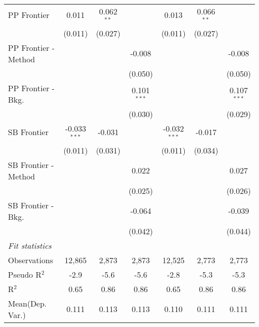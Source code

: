 \begin{tabular}{lcccccc}
   PP Frontier          & 0.011          & 0.062$^{**}$ &               & 0.013          & 0.066$^{**}$ &   \\   
                        & (0.011)        & (0.027)      &               & (0.011)        & (0.027)      &   \\   
   PP Frontier - Method &                &              & -0.008        &                &              & -0.008\\   
                        &                &              & (0.050)       &                &              & (0.050)\\   
   PP Frontier - Bkg.   &                &              & 0.101$^{***}$ &                &              & 0.107$^{***}$\\   
                        &                &              & (0.030)       &                &              & (0.029)\\   
   SB Frontier          & -0.033$^{***}$ & -0.031       &               & -0.032$^{***}$ & -0.017       &   \\   
                        & (0.011)        & (0.031)      &               & (0.011)        & (0.034)      &   \\   
   SB Frontier - Method &                &              & 0.022         &                &              & 0.027\\   
                        &                &              & (0.025)       &                &              & (0.026)\\   
   SB Frontier - Bkg.   &                &              & -0.064        &                &              & -0.039\\   
                        &                &              & (0.042)       &                &              & (0.044)\\   
   \midrule
   \emph{Fit statistics}\\
   Observations         & 12,865         & 2,873        & 2,873         & 12,525         & 2,773        & 2,773\\  
   Pseudo R$^2$         & -2.9           & -5.6         & -5.6          & -2.8           & -5.3         & -5.3\\  
   R$^2$                & 0.65           & 0.86         & 0.86          & 0.65           & 0.86         & 0.86\\  
Mean(Dep. Var.) & 0.111 & 0.113 & 0.113 & 0.110 & 0.111 & 0.111 \\
   

\end{tabular}

